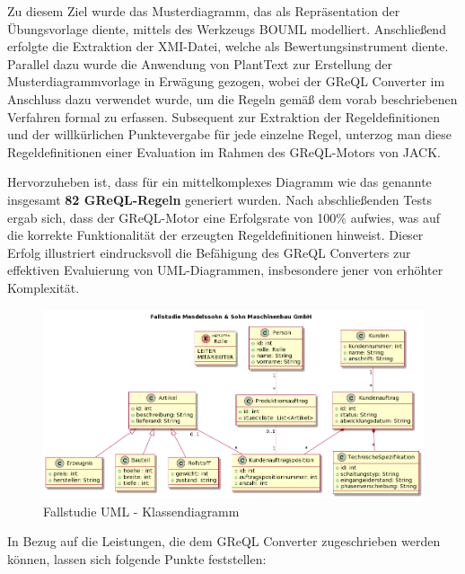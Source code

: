 Zu diesem Ziel wurde das Musterdiagramm, das als Repräsentation der Übungsvorlage diente, mittels des Werkzeugs
BOUML modelliert. Anschließend erfolgte die Extraktion der XMI-Datei, welche als Bewertungsinstrument diente. Parallel
dazu wurde die Anwendung von PlantText zur Erstellung der Musterdiagrammvorlage in Erwägung gezogen, wobei der GReQL
Converter im Anschluss dazu verwendet wurde, um die Regeln gemäß dem vorab beschriebenen Verfahren formal zu erfassen.
Subsequent zur Extraktion der Regeldefinitionen und der willkürlichen Punktevergabe für jede einzelne Regel, unterzog
man diese Regeldefinitionen einer Evaluation im Rahmen des GReQL-Motors von JACK.

Hervorzuheben ist, dass für ein mittelkomplexes Diagramm wie das genannte insgesamt \textbf{82 GReQL-Regeln} generiert
wurden. Nach abschließenden Tests ergab sich, dass der GReQL-Motor eine Erfolgsrate von 100\% aufwies, was auf die
korrekte Funktionalität der erzeugten Regeldefinitionen hinweist. Dieser Erfolg illustriert eindrucksvoll die Befähigung
des GReQL Converters zur effektiven Evaluierung von UML-Diagrammen, insbesondere jener von erhöhter Komplexität.

\begin{figure}[h]
    \centering
    \includegraphics[width=16cm]{images/bau_gmbh_plantText}
    \caption{Fallstudie UML - Klassendiagramm}
    \label{fig:bau_gmbh}
\end{figure}

In Bezug auf die Leistungen, die dem GReQL Converter zugeschrieben werden können, lassen sich folgende Punkte
feststellen:

